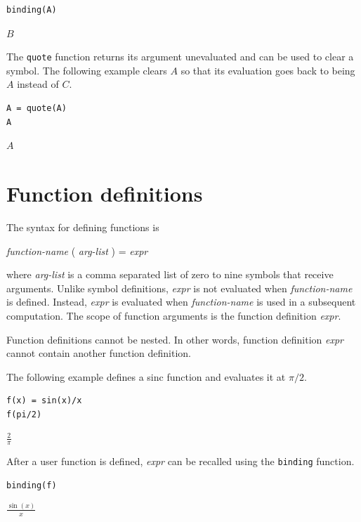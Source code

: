 \documentclass[12pt]{article}
\begin{document}
{\color{blue}
\begin{verbatim}
binding(A)
\end{verbatim}
}

$\displaystyle B$

\bigskip

The \verb$quote$ function returns its argument unevaluated
and can be used to clear a symbol.
The following example clears $A$ so that its evaluation goes back to
being $A$ instead of $C$.

{\color{blue}
\begin{verbatim}
A = quote(A)
A
\end{verbatim}
}

$\displaystyle A$

\newpage

\section{Function definitions}

The syntax for defining functions is
\begin{center}
{\it function-name} ( {\it arg-list} ) = {\it expr}
\end{center}
where {\it arg-list} is a comma separated list of zero to nine symbols that receive arguments.
Unlike symbol definitions, {\it expr} is not evaluated when {\it function-name} is defined.
Instead, {\it expr} is evaluated when {\it function-name} is used in a subsequent computation.
The scope of function arguments is the function definition {\it expr}.

\bigskip
Function definitions cannot be nested.
In other words, function definition {\it expr}
cannot contain another function definition.

\bigskip
The following example defines a sinc function and evaluates it at $\pi/2$.

{\color{blue}
\begin{verbatim}
f(x) = sin(x)/x
f(pi/2)
\end{verbatim}}

$\displaystyle \frac{2}{\pi}$

\bigskip
After a user function is defined, {\it expr} can be recalled using the
\verb$binding$ function.

{\color{blue}
\begin{verbatim}
binding(f)
\end{verbatim}}

$\displaystyle \frac{\sin(x)}{x}$
\end{document}
